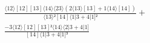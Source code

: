 \documentclass[varwidth, border=5pt]{standalone}
\begin{document}
\begin{my}
$\begin{gathered}
\scriptscriptstyle\frac{⟨12⟩[12][13]⟨14⟩⟨23⟩(2⟨13⟩[13]+1⟨14⟩[14])}{⟨13⟩²[14]⟨1|3+4|1]²} +\\
\scriptscriptstyle\frac{-3⟨12⟩[12][13]²⟨14⟩⟨2|3+4|1]}{[14]⟨1|3+4|1]³} \phantom{+}
\end{gathered}$
\end{my}
\end{document}
